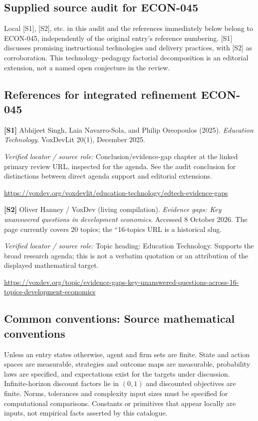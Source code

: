 \documentclass[11pt,a4paper]{article}
\begin{document}
\subsection*{Supplied source audit for ECON-045}
Local [S1], [S2], etc. in this audit and the references immediately below
belong to ECON-045, independently of the original entry's reference numbering.
[S1] discusses promising instructional technologies and delivery practices, with [S2] as corroboration. This technology--pedagogy factorial decomposition is an editorial extension, not a named open conjecture in the review.
\subsection*{References for integrated refinement ECON-045}
{\footnotesize\raggedright
\par\noindent\textbf{[S1]} Abhijeet Singh, Laia Navarro-Sola, and Philip Oreopoulos (2025). \emph{Education Technology}. VoxDevLit 20(1), December 2025.\par \textit{Verified locator / source role:} Conclusion/evidence-gap chapter at the linked primary review URL, inspected for the agenda. See the audit conclusion for distinctions between direct agenda support and editorial extensions.\par \url{https://voxdev.org/voxdevlit/education-technology/edtech-evidence-gaps}\par\smallskip
\par\noindent\textbf{[S2]} Oliver Hanney / VoxDev (living compilation). \emph{Evidence gaps: Key unanswered questions in development economics}. Accessed 8 October 2026. The page currently covers 20 topics; the ``16-topics URL is a historical slug.\par \textit{Verified locator / source role:} Topic heading: Education Technology. Supports the broad research agenda; this is not a verbatim quotation or an attribution of the displayed mathematical target.\par \url{https://voxdev.org/topic/evidence-gaps-key-unanswered-questions-across-16-topics-development-economics}\par\smallskip
}

\subsection*{Common conventions: Source mathematical conventions}

Unless an entry states otherwise, agent and firm sets are finite. State and action spaces are measurable, strategies and outcome maps are measurable, probability laws are specified, and expectations exist for the targets under discussion. Infinite-horizon discount factors lie in $(0,1)$ and discounted objectives are finite. Norms, tolerances and complexity input sizes must be specified for computational comparisons. Constants or primitives that appear locally are inputs, not empirical facts asserted by this catalogue.
\end{document}
